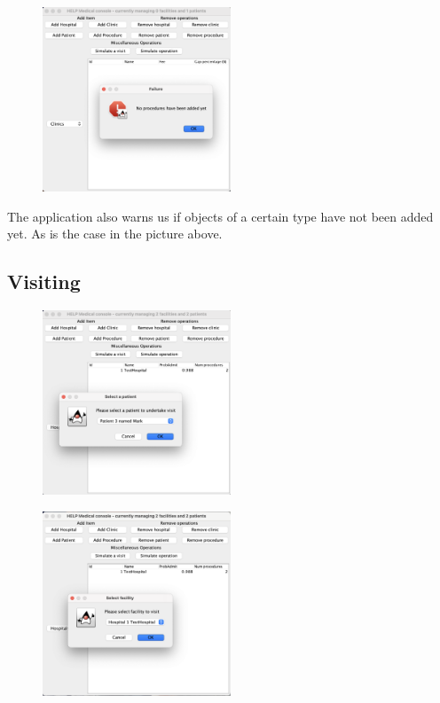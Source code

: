 \documentclass{article}
\begin{document}
\begin{figure}
  \begin{center}
    \includegraphics[width=0.5\textwidth]{./figures/Remove/Procedures_1.png}
  \end{center}
\end{figure}

The application also warns us if objects of a certain type have not been added yet. As is the case in the picture above.

\subsection{Visiting}\label{sub:visiting} %
\begin{figure}
  \begin{center}
    \includegraphics[width=0.5\textwidth]{./figures/Visit/Visit_1.png}
  \end{center}
\end{figure}

\begin{figure}
  \begin{center}
    \includegraphics[width=0.5\textwidth]{./figures/Visit/Visit_2.png}
  \end{center}
\end{figure}
\end{document}
